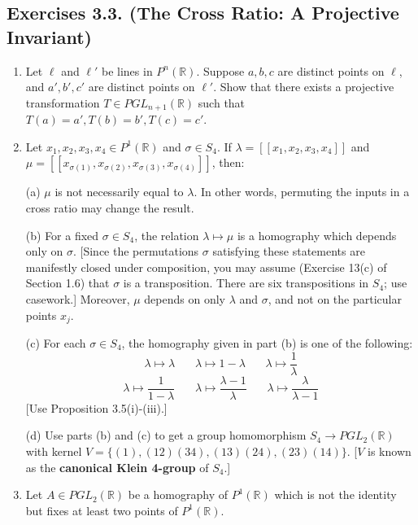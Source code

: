 \documentclass[leqno]{book}
\begin{document}
\subsection*{Exercises 3.3. (The Cross Ratio: A Projective Invariant)}
\begin{enumerate}
\item Let $\ell$ and $\ell'$ be lines in $P^n(\mathbb R)$.  Suppose $a,b,c$ are distinct points on $\ell$, and $a',b',c'$ are distinct points on $\ell'$.  Show that there exists a projective transformation $T\in PGL_{n+1}(\mathbb R)$ such that $T(a)=a',T(b)=b',T(c)=c'$.

\item Let $x_1,x_2,x_3,x_4\in P^1(\mathbb R)$ and $\sigma\in S_4$.  If $\lambda=[\![x_1,x_2,x_3,x_4]\!]$ and $\mu=[\![x_{\sigma(1)},x_{\sigma(2)},x_{\sigma(3)},x_{\sigma(4)}]\!]$, then:

(a) $\mu$ is not necessarily equal to $\lambda$.  In other words, permuting the inputs in a cross ratio may change the result.

(b) For a fixed $\sigma\in S_4$, the relation $\lambda\mapsto\mu$ is a homography which depends only on $\sigma$.  [Since the permutations $\sigma$ satisfying these statements are manifestly closed under composition, you may assume (Exercise 13(c) of Section 1.6) that $\sigma$ is a transposition.  There are six transpositions in $S_4$; use casework.]  Moreover, $\mu$ depends on only $\lambda$ and $\sigma$, and not on the particular points $x_j$.

(c) For each $\sigma\in S_4$, the homography given in part (b) is one of the following:
$$\lambda\mapsto\lambda~~~~~~~~\lambda\mapsto 1-\lambda~~~~~~~~\lambda\mapsto\frac 1{\lambda}$$
$$\lambda\mapsto\frac 1{1-\lambda}~~~~~~~~\lambda\mapsto\frac{\lambda-1}{\lambda}~~~~~~~~\lambda\mapsto\frac{\lambda}{\lambda-1}$$
[Use Proposition 3.5(i)-(iii).]

(d) Use parts (b) and (c) to get a group homomorphism $S_4\to PGL_2(\mathbb R)$ with kernel $V=\{(1),(12)(34),(13)(24),(23)(14)\}$.  [$V$ is known as the \textbf{canonical Klein 4-group} of $S_4$.]

\item Let $A\in PGL_2(\mathbb R)$ be a homography of $P^1(\mathbb R)$ which is not the identity but fixes at least two points of $P^1(\mathbb R)$. %


\end{enumerate}
\end{document}
